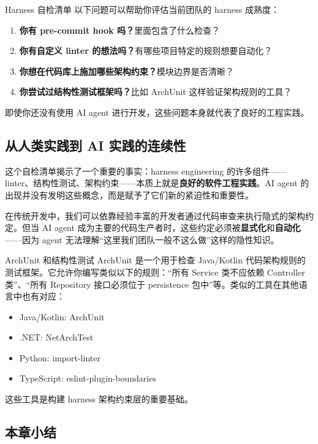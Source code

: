 \documentclass[a4paper]{article}
\begin{document}
\begin{importantbox}{Harness 自检清单}
以下问题可以帮助你评估当前团队的 harness 成熟度：
\begin{enumerate}[leftmargin=1.5em]
    \item \textbf{你有 pre-commit hook 吗？}里面包含了什么检查？
    \item \textbf{你有自定义 linter 的想法吗？}有哪些项目特定的规则想要自动化？
    \item \textbf{你想在代码库上施加哪些架构约束？}模块边界是否清晰？
    \item \textbf{你尝试过结构性测试框架吗？}比如 ArchUnit 这样验证架构规则的工具？
\end{enumerate}
即使你还没有使用 AI agent 进行开发，这些问题本身就代表了良好的工程实践。
\end{importantbox}

\subsection{从人类实践到 AI 实践的连续性}

这个自检清单揭示了一个重要的事实：harness engineering 的许多组件------linter、结构性测试、架构约束------本质上就是\textbf{良好的软件工程实践}。AI agent 的出现并没有发明这些概念，而是赋予了它们新的紧迫性和重要性。

在传统开发中，我们可以依靠经验丰富的开发者通过代码审查来执行隐式的架构约定。但当 AI agent 成为主要的代码生产者时，这些约定必须被\textbf{显式化}和\textbf{自动化}------因为 agent 无法理解``这里我们团队一般不这么做''这样的隐性知识。

\begin{knowledgebox}{ArchUnit 和结构性测试}
ArchUnit 是一个用于检查 Java/Kotlin 代码架构规则的测试框架。它允许你编写类似以下的规则：``所有 Service 类不应依赖 Controller 类''、``所有 Repository 接口必须位于 persistence 包中''等。类似的工具在其他语言中也有对应：
\begin{itemize}[leftmargin=1.5em]
    \item Java/Kotlin: ArchUnit
    \item .NET: NetArchTest
    \item Python: import-linter
    \item TypeScript: eslint-plugin-boundaries
\end{itemize}
这些工具是构建 harness 架构约束层的重要基础。
\end{knowledgebox}

\subsection{本章小结}
\end{document}
